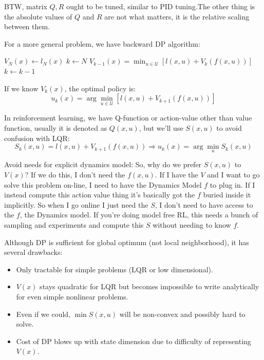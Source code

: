 BTW, matrix $Q, R$ ought to be tuned, similar to PID tuning.The other thing is the absolute values of $Q$ and $R$ are not what matters, it is the relative scaling between them.

For a more general problem, we have backward DP algorithm:

\begin{algorithmic}[1]
    \STATE $V_N(x)\gets l_N(x)$
    \STATE $k\gets N$
      \STATE $V_{k-1}(x) = \min_{u\in\mathcal{U}}\left[l\left(x,u\right)+V_k\left(f\left(x,u\right)\right)\right]$
      \STATE $k\gets k-1$
    \ENDWHILE
\end{algorithmic}

If we know $V_k(x)$, the optimal policy is:
\begin{equation}
    u_{k}(x) = \arg\min_{u\in\mathcal{U}}\left[l\left(x,u\right)+V_{k+1}\left(f\left(x,u\right)\right)\right]
\end{equation}

In reinforcement learning, we have Q-function or action-value other than value function, usually it is denoted as $Q(x,u)$, but we'll use $S(x, u)$ to avoid confusion with LQR:
\begin{equation}
    S_k(x,u)=l(x,u)+V_{k+1}(f(x,u)) \Rightarrow u_k(x)=\arg\min_{u} S_k(x, u)
\end{equation}

Avoid needs for explicit dynamics model: So, why do we prefer $S(x,u)$ to $V(x)$? If we do this, I don't need the $f(x,u)$. If I have the $V$ and I want to go solve this problem on-line, I need to have the Dynamics Model $f$ to plug in. If I instead compute this action value thing it's basically got the $f$ buried inside it implicitly. So when I go online I just need the $S$, I don't need to have access to the $f$, the Dynamics model. If you're doing model free RL, this needs a bunch of sampling and experiments and compute this $S$ without needing to know $f$.

Although DP is sufficient for global optimum (not local neighborhood), it has several drawbacks:
\begin{itemize}
    \item Only tractable for simple problems (LQR or low dimensional).
    \item $V(x)$ stays quadratic for LQR but becomes impossible to write analytically for even simple nonlinear problems.
    \item Even if we could, $\min S(x,u)$ will be non-convex and possibly hard to solve.
    \item Cost of DP blows up with state dimension due to difficulty of representing $V(x)$.
\end{itemize}

